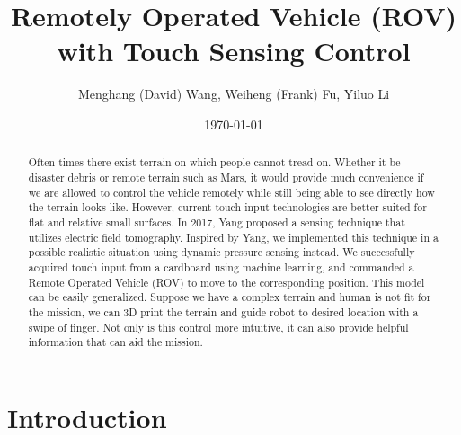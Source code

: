 \documentclass[reprint,amsmath, amsfonts, amssymb, aps, letterpaper]{revtex4-1}
\begin{document}
\title{Remotely Operated Vehicle (ROV) with Touch Sensing Control}
\author{Menghang (David) Wang, Weiheng (Frank) Fu, Yiluo Li}

\date{\today}



\begin{abstract}
Often times there exist terrain on which people cannot tread on. Whether it be disaster debris or remote terrain such as Mars, it would provide much convenience if we are allowed to control the vehicle remotely while still being able to see directly how the terrain looks like. However, current touch input technologies are better suited for flat and relative small surfaces. In 2017, Yang \citep{electrick} proposed a sensing technique that utilizes electric field tomography. Inspired by Yang, we implemented this technique in a possible realistic situation using dynamic pressure sensing instead. We successfully acquired touch input from a cardboard using machine learning, and commanded a Remote Operated Vehicle (ROV) to move to the corresponding position. This model can be easily generalized. Suppose we have a complex terrain and human is not fit for the mission, we can 3D print the terrain and guide robot to desired location with a swipe of finger. Not only is this control more intuitive, it can also provide helpful information that can aid the mission.

\end{abstract}

\maketitle

\section{Introduction}
\end{document}
